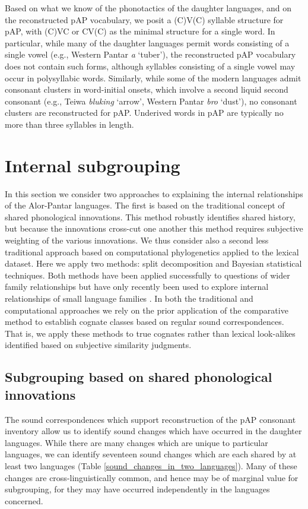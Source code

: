 Based on what we know of the phonotactics of the daughter languages, and on the reconstructed pAP vocabulary, we posit a (C)V(C) syllable structure for pAP, with (C)VC or CV(C) as the minimal structure for a single word. In particular, while many of the daughter languages permit words consisting of a single vowel (e.g., Western Pantar \textit{a }`tuber'), the reconstructed pAP vocabulary does not contain such forms, although syllables consisting of a single vowel may occur in polysyllabic words. Similarly, while some of the modern languages admit consonant clusters in word-initial onsets, which involve a second liquid second consonant (e.g., Teiwa \textit{bluking} `arrow', Western Pantar \textit{bro} `dust'), no consonant clusters are reconstructed for pAP. Underived words in pAP are typically no more than three syllables in length.

\section{Internal subgrouping}
In this section we consider two approaches to explaining the internal relationships of the Alor-Pantar languages. The first is based on the traditional concept of shared phonological innovations. This method robustly identifies shared history, but because the innovations cross-cut one another this method requires subjective weighting of the various innovations. We thus consider also a second less traditional approach based on computational phylogenetics applied to the lexical dataset. Here we apply two methods: split decomposition and Bayesian statistical techniques. Both methods have been applied successfully to questions of wider family relationships but have only recently been used to explore internal relationships of small language families \citep[e.g.][]{DunnEtAl2011}. In both the traditional and computational approaches we rely on the prior application of the comparative method to establish cognate classes based on regular sound correspondences. That is, we apply these methods to true cognates rather than 
lexical look-alikes identified based on subjective similarity judgments.

\subsection{ Subgrouping based on shared phonological innovations}
The sound correspondences which support reconstruction of the pAP consonant inventory allow us to identify sound changes which have occurred in the daughter languages. While there are many changes which are unique to particular languages, we can identify seventeen sound changes which are each shared by at least two languages (Table \ref{sound_changes_in_two_languages}). Many of these changes are cross-linguistically common, and hence may be of marginal value for subgrouping, for they may have occurred independently in the languages concerned. 





